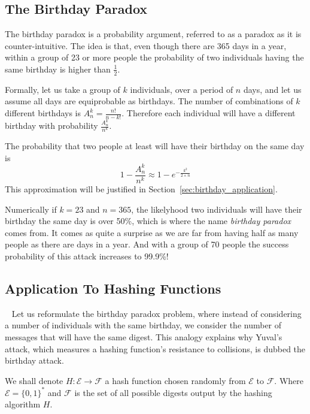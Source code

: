 \subsection{The Birthday Paradox}
The birthday paradox is a probability argument, referred to as a paradox as it is counter-intuitive.
The idea is that, even though there are 365 days in a year, within a group of 23 or more people the probability of two individuals having the same birthday is higher than $\frac{1}{2}$.

Formally, let us take a group of $k$ individuals, over a period of $n$ days, and let us assume all days are equiprobable as birthdays.
The number of combinations of $k$ different birthdays is $A_n^k=\frac{n!}{n-k!}$. Therefore each individual will have a different birthday with probability $\frac{A_n^k}{n^k}$.

The probability that two people at least will have their birthday on the same day is $$1-\frac{A_n^k}{n^k} \approx 1 - e^{-\frac{k^2}{2 \times n}}$$
This approximation will be justified in Section~\ref{sec:birthday_application}.

Numerically if $k=23$ and $n=365$, the likelyhood two individuals will have their birthday the same day is over 50\%, which is where the name \emph{birthday paradox} comes from. It comes as quite a surprise as we are far from having half as many people as there are days in a year. 
And with a group of 70 people the success probability of this attack increases to 99.9\%!

\subsection{Application To Hashing Functions}~\label{sec:birthday_application}
Let us reformulate the birthday paradox problem, where instead of considering a number of individuals with the same birthday, we consider the number of messages that will have the same digest. This analogy explains why Yuval's attack, which measures a hashing function's resistance to collisions, is dubbed the birthday attack.

We shall denote $H:\mathcal{E} \rightarrow \mathcal{F}$ a hash function chosen randomly from $\mathcal{E}$ to $\mathcal{F}$. Where $\mathcal{E}={\{0,1\}}^*$ and $\mathcal{F}$ is the set of all possible digests output by the hashing algorithm $H$.

